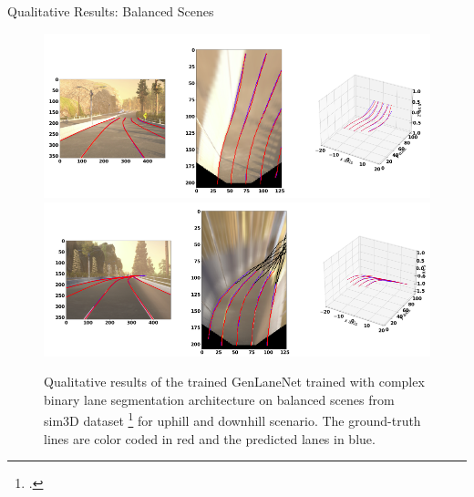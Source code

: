 \documentclass[aspectratio=169]{beamer}
\begin{document}

\begin{frame}{Qualitative Results: Balanced Scenes}
 \begin{figure}[h]
      \caption{Qualitative results of the trained GenLaneNet trained with complex binary lane segmentation architecture on balanced scenes from sim3D dataset \footcite{guo2020gen} for uphill and downhill scenario. The ground-truth lines are color coded in red and the predicted lanes in blue. }
        \centering 
       \includegraphics[scale=0.2]{images/uphill_standard.png}
       \hfill
       \includegraphics[scale=0.2]{images/downhill_standard.png}
        \end{figure}
    
\end{frame}
\end{document}
